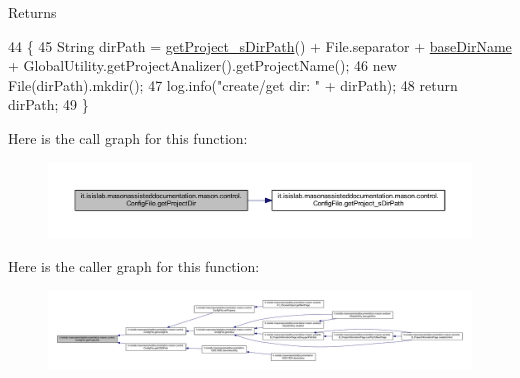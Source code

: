 \begin{DoxyReturn}{Returns}

\end{DoxyReturn}

\begin{DoxyCode}
44                                          \{
45         String dirPath = \hyperlink{classit_1_1isislab_1_1masonassisteddocumentation_1_1mason_1_1control_1_1_config_file_add444e913763f18b80005e5ad477c59d}{getProject\_sDirPath}() + File.separator + 
      \hyperlink{classit_1_1isislab_1_1masonassisteddocumentation_1_1mason_1_1control_1_1_config_file_a221de037cd407ebbe144ef1dd91b82d2}{baseDirName} + GlobalUtility.getProjectAnalizer().getProjectName();
46         \textcolor{keyword}{new} File(dirPath).mkdir();
47         log.info(\textcolor{stringliteral}{"create/get dir: "} + dirPath);
48         \textcolor{keywordflow}{return} dirPath;
49     \}
\end{DoxyCode}


Here is the call graph for this function\-:
\nopagebreak
\begin{figure}[H]
\begin{center}
\leavevmode
\includegraphics[width=350pt]{classit_1_1isislab_1_1masonassisteddocumentation_1_1mason_1_1control_1_1_config_file_a67bf373e54fb3ce5144d6f4fcbb48bfd_cgraph}
\end{center}
\end{figure}




Here is the caller graph for this function\-:
\nopagebreak
\begin{figure}[H]
\begin{center}
\leavevmode
\includegraphics[width=350pt]{classit_1_1isislab_1_1masonassisteddocumentation_1_1mason_1_1control_1_1_config_file_a67bf373e54fb3ce5144d6f4fcbb48bfd_icgraph}
\end{center}
\end{figure}


